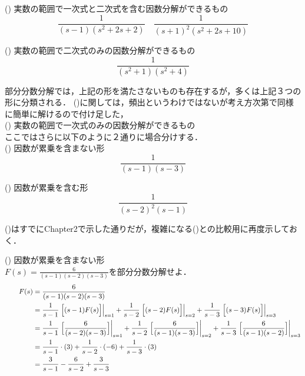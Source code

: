 \documentclass[a4paper,12pt]{report}
\begin{document}
    \quad (\MakeUppercase{}) 実数の範囲で一次式と二次式を含む因数分解ができるもの \\
    \[
    \frac{1}{\left(s-1\right) \left(s^2+2s+2\right)} \quad \frac{1}{\left(s+1\right)^2 \left(s^2+2s+10\right)}
    \]

  \quad (\MakeUppercase{}) 実数の範囲で二次式のみの因数分解ができるもの \\
    \[
    \frac{1}{\left(s^2+1\right) \left(s^2+4\right)} 
    \]

    部分分数分解では，上記の形を満たさないものも存在するが，多くは上記３つの形に分類される．
    (\MakeUppercase{})に関しては，頻出というわけではないが考え方次第で同様に簡単に解けるので付け足した，\\

    (\MakeUppercase{}) 実数の範囲で一次式のみの因数分解ができるもの \\

    \vspace{2mm}
    ここではさらに以下のように２通りに場合分けする．\\

    \qquad({}) 因数が累乗を含まない形 \\
    \[
    \frac{1}{\left(s-1\right) \left(s-3\right)} 
    \]

    \qquad({}) 因数が累乗を含む形 \\
    \[
    \frac{1}{\left(s-2\right)^2 \left(s-1\right)}
    \]
    
    ({})はすでにChapter2で示した通りだが，複雑になる({})との比較用に再度示しておく．

\newpage
\quad({}) 因数が累乗を含まない形 \\

\qquad \(F(s) =  \frac{6}{(s-1)(s-2)(s-3)}\)を部分分数分解せよ．
\begin{align*}
  \qquad F(s) &= \frac{6}{(s-1)(s-2)(s-3)} \\
      &= \frac{1}{s-1}\left.\Bigl[(s-1)F(s)\Bigr]\right|_{s=1} 
          + \frac{1}{s-2}\left.\Bigl[(s-2)F(s)\Bigr]\right|_{s=2}
          + \frac{1}{s-3}\left.\Bigl[(s-3)F(s)\Bigr]\right|_{s=3}\\
      &= \frac{1}{s-1}\left.\Bigl[\frac{6}{(s-2)(s-3)}\Bigr]\right|_{s=1} 
          + \frac{1}{s-2}\left.\Bigl[\frac{6}{(s-1)(s-3)}\Bigr]\right|_{s=2}
          + \frac{1}{s-3}\left.\Bigl[\frac{6}{(s-1)(s-2)}\Bigr]\right|_{s=3}\\
      &= \frac{1}{s-1}\cdot(3) 
          + \frac{1}{s-2}\cdot(-6)
          + \frac{1}{s-3}\cdot(3)\\
      &= \frac{3}{s-1} 
      - \frac{6}{s-2}
      + \frac{3}{s-3}\\
\end{align*}
\end{document}

